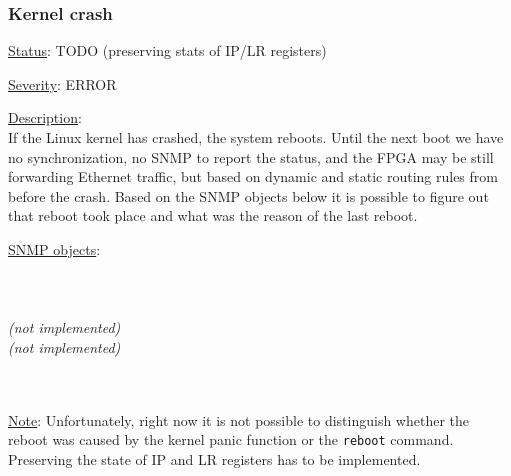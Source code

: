 \subsubsection{\bf Kernel crash}
		\begin{pck_descr}
      \item [] \underline{Status}: TODO (preserving stats of IP/LR registers)
			\item [] \underline{Severity}: ERROR
			\item [] \underline{Description}:\\
				If the Linux kernel has crashed, the system reboots. Until the next boot
        we have no synchronization, no SNMP to report the status, and the FPGA
        may be still forwarding Ethernet traffic, but based on dynamic and
        static routing rules from before the crash. Based on the SNMP objects
        below it is possible to figure out that reboot took place and what was
        the reason of the last reboot.
			\item [] \underline{SNMP objects}:\\
        {\footnotesize
				\\
				\\
				\\
				 \emph{(not implemented)}\\
				 \emph{(not implemented)}\\
				\\
				\\
         }
			\item [] \underline{Note}:
				Unfortunately, right now it is not possible to distinguish whether the
				reboot was caused by the kernel panic function or the \texttt{reboot}
				command. Preserving the state of IP and LR registers has to be
				implemented.
		\end{pck_descr}
